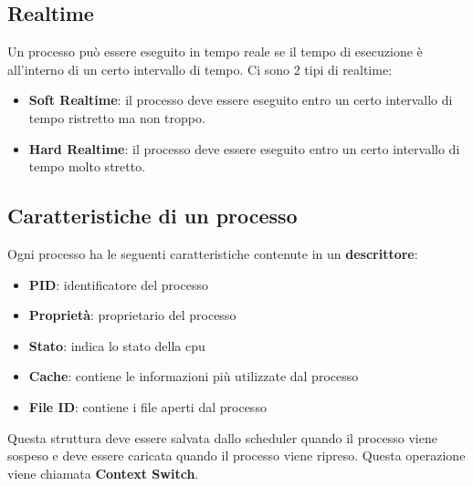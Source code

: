 \documentclass[a4paper]{article}
\theoremstyle{break}
\theoremstyle{break}
\theoremstyle{break}
\theoremstyle{break}
\begin{document}
\subsection{Realtime}
Un processo può essere eseguito in tempo reale se il tempo di esecuzione è all'interno
di un certo intervallo di tempo. Ci sono 2 tipi di realtime:
\begin{itemize}
  \item \textbf{Soft Realtime}: il processo deve essere eseguito entro un certo intervallo
  di tempo ristretto ma non troppo.
  \item \textbf{Hard Realtime}: il processo deve essere eseguito entro un certo intervallo
  di tempo molto stretto.
\end{itemize}

\subsection{Caratteristiche di un processo}
Ogni processo ha le seguenti caratteristiche contenute in un \textbf{descrittore}:
\begin{itemize}
  \item \textbf{PID}: identificatore del processo
  \item \textbf{Proprietà}: proprietario del processo
  \item \textbf{Stato}: indica lo stato della cpu
  \item \textbf{Cache}: contiene le informazioni più utilizzate dal processo
  \item \textbf{File ID}: contiene i file aperti dal processo
\end{itemize}

\noindent Questa struttura deve essere salvata dallo scheduler quando il processo viene
sospeso e deve essere caricata quando il processo viene ripreso. Questa operazione
viene chiamata \textbf{Context Switch}.
\end{document}
